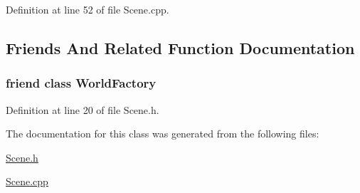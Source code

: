 Definition at line 52 of file Scene.\+cpp.



\subsection{Friends And Related Function Documentation}
\hypertarget{classjli_1_1_scene_acb96ebb09abe8f2a37a915a842babfac}{
\subsubsection[{World\+Factory}]{\setlength{\rightskip}{0pt plus 5cm}friend class {\bf World\+Factory}\hspace{0.3cm}{\ttfamily [friend]}}}\label{classjli_1_1_scene_acb96ebb09abe8f2a37a915a842babfac}


Definition at line 20 of file Scene.\+h.



The documentation for this class was generated from the following files\+:\begin{DoxyCompactItemize}
\item 
\hyperlink{_scene_8h}{Scene.\+h}\item 
\hyperlink{_scene_8cpp}{Scene.\+cpp}\end{DoxyCompactItemize}
